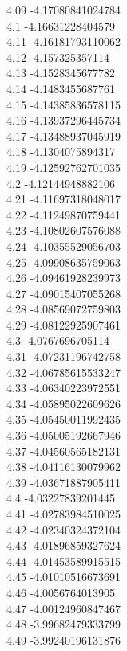 {4.09	-4.17080841024784\\
4.1	-4.16631228404579\\
4.11	-4.16181793110062\\
4.12	-4.157325357114\\
4.13	-4.1528345677782\\
4.14	-4.1483455687761\\
4.15	-4.14385836578115\\
4.16	-4.13937296445734\\
4.17	-4.13488937045919\\
4.18	-4.1304075894317\\
4.19	-4.12592762701035\\
4.2	-4.12144948882106\\
4.21	-4.11697318048017\\
4.22	-4.11249870759441\\
4.23	-4.10802607576088\\
4.24	-4.10355529056703\\
4.25	-4.09908635759063\\
4.26	-4.09461928239973\\
4.27	-4.09015407055268\\
4.28	-4.08569072759803\\
4.29	-4.08122925907461\\
4.3	-4.0767696705114\\
4.31	-4.07231196742758\\
4.32	-4.06785615533247\\
4.33	-4.06340223972551\\
4.34	-4.05895022609626\\
4.35	-4.05450011992435\\
4.36	-4.05005192667946\\
4.37	-4.04560565182131\\
4.38	-4.04116130079962\\
4.39	-4.03671887905411\\
4.4	-4.03227839201445\\
4.41	-4.02783984510025\\
4.42	-4.02340324372104\\
4.43	-4.01896859327624\\
4.44	-4.01453589915515\\
4.45	-4.01010516673691\\
4.46	-4.0056764013905\\
4.47	-4.00124960847467\\
4.48	-3.99682479333799\\
4.49	-3.99240196131876\\
}
